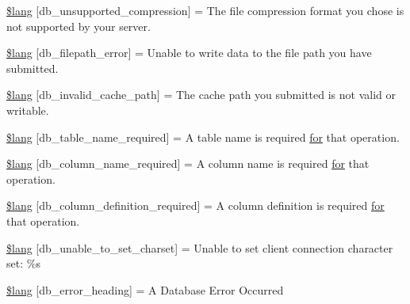 \begin{DoxyCompactItemize}
\item 
\hyperlink{db__lang_8php_ae745d23d59478f529442768816df6f36}{\$lang} \mbox{[}\textquotesingle{}db\+\_\+unsupported\+\_\+compression\textquotesingle{}\mbox{]} = \textquotesingle{}The file compression format you chose is not supported by your server.\textquotesingle{}
\item 
\hyperlink{db__lang_8php_a0519c50a806cec99f29b499aec2582e5}{\$lang} \mbox{[}\textquotesingle{}db\+\_\+filepath\+\_\+error\textquotesingle{}\mbox{]} = \textquotesingle{}Unable to write data to the file path you have submitted.\textquotesingle{}
\item 
\hyperlink{db__lang_8php_a67157df2896b342e247ab744adf2b9e5}{\$lang} \mbox{[}\textquotesingle{}db\+\_\+invalid\+\_\+cache\+\_\+path\textquotesingle{}\mbox{]} = \textquotesingle{}The cache path you submitted is not valid or writable.\textquotesingle{}
\item 
\hyperlink{db__lang_8php_a2899cf8f7246d7fa97660ea52856ade5}{\$lang} \mbox{[}\textquotesingle{}db\+\_\+table\+\_\+name\+\_\+required\textquotesingle{}\mbox{]} = \textquotesingle{}A table name is required \hyperlink{confirm__transfer_8php_aaf007b9fa5c90d7c5a7011bece9cfc15}{for} that operation.\textquotesingle{}
\item 
\hyperlink{db__lang_8php_ac87ab86a1f105d87327480b6d0659b13}{\$lang} \mbox{[}\textquotesingle{}db\+\_\+column\+\_\+name\+\_\+required\textquotesingle{}\mbox{]} = \textquotesingle{}A column name is required \hyperlink{confirm__transfer_8php_aaf007b9fa5c90d7c5a7011bece9cfc15}{for} that operation.\textquotesingle{}
\item 
\hyperlink{db__lang_8php_ad0ba270704ec81f8f89e486a18660354}{\$lang} \mbox{[}\textquotesingle{}db\+\_\+column\+\_\+definition\+\_\+required\textquotesingle{}\mbox{]} = \textquotesingle{}A column definition is required \hyperlink{confirm__transfer_8php_aaf007b9fa5c90d7c5a7011bece9cfc15}{for} that operation.\textquotesingle{}
\item 
\hyperlink{db__lang_8php_ab22396948e25460833329cb8786ad831}{\$lang} \mbox{[}\textquotesingle{}db\+\_\+unable\+\_\+to\+\_\+set\+\_\+charset\textquotesingle{}\mbox{]} = \textquotesingle{}Unable to set client connection character set\+: \%s\textquotesingle{}
\item 
\hyperlink{db__lang_8php_a4be34cea2490b0d41689b65e52286658}{\$lang} \mbox{[}\textquotesingle{}db\+\_\+error\+\_\+heading\textquotesingle{}\mbox{]} = \textquotesingle{}A Database Error Occurred\textquotesingle{}
\end{DoxyCompactItemize}


